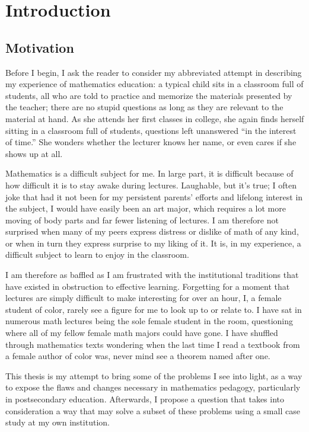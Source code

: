 \chapter{Introduction}
\section{Motivation}

Before I begin, I ask the reader to consider my abbreviated attempt in describing my experience of mathematics education: a typical child sits in a classroom full of students, all who are told to practice and memorize the materials presented by the teacher; there are no stupid questions as long as they are relevant to the material at hand. As she attends her first classes in college, she again finds herself sitting in a classroom full of students, questions left unanswered ``in the interest of time.'' She wonders whether the lecturer knows her name, or even cares if she shows up at all.

Mathematics is a difficult subject for me. In large part, it is difficult because of how difficult it is to stay awake during lectures. Laughable, but it's true; I often joke that had it not been for my persistent parents' efforts and lifelong interest in the subject, I would have easily been an art major, which requires a lot more moving of body parts and far fewer listening of lectures. I am therefore not surprised when many of my peers express distress or dislike of math of any kind, or when in turn they express surprise to my liking of it. It is, in my experience, a difficult subject to learn to enjoy in the classroom.

I am therefore as baffled as I am frustrated with the institutional traditions that have existed in obstruction to effective learning. Forgetting for a moment that lectures are simply difficult to make interesting for over an hour, I, a female student of color, rarely see a figure for me to look up to or relate to. I have sat in numerous math lectures being the sole female student in the room, questioning where all of my fellow female math majors could have gone. I have shuffled through mathematics texts wondering when the last time I read a textbook from a female author of color was, never mind see a theorem named after one.

This thesis is my attempt to bring some of the problems I see into light, as a way to expose the flaws and changes necessary in mathematics pedagogy, particularly in postsecondary education. Afterwards, I propose a question that takes into consideration a way that may solve a subset of these problems using a small case study at my own institution.

